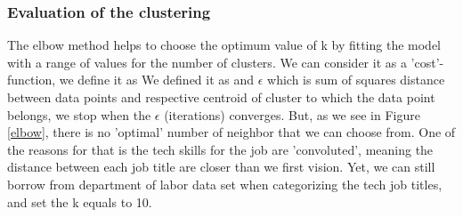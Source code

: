\subsubsection{Evaluation of the clustering}
The elbow method helps to choose the optimum value of k by fitting the model with a range of values for the number of clusters. We can consider it as a 'cost'-function, we define it as We defined it  as and $\epsilon$ which is sum of squares  distance between data points and respective centroid of cluster to which the data point belongs, we stop when the $\epsilon$ (iterations) converges. But, as we see in Figure \ref{elbow}, there is no 'optimal' number of neighbor that we can choose from. One of the reasons for that is the tech skills for the job are 'convoluted', meaning the distance between each job title are closer than we first vision. Yet, we can still borrow from department of labor data set when categorizing the tech job titles, and set the k equals to 10.

